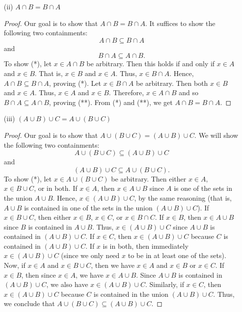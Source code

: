 \documentclass[a4paper]{article}
\begin{document}
\begin{enumerate}
\begin{proof}
        \end{proof}
    \item[(ii)] \( A \cap B = B \cap A  \)
        \begin{proof}
        Our goal is to show that \( A \cap B = B \cap A  \). It suffices to show the following two containments:
        \[ A \cap B \subseteq  B \cap A  \tag{*}  \]
        and
        \[  B \cap A \subseteq  A \cap B. \tag{**}  \]
        To show (*), let \( x \in A \cap B  \) be arbitrary. Then this holds if and only if \( x \in A  \) and \( x \in B \). That is, \( x \in B  \) and \( x \in A  \). Thus, \( x \in B \cap A   \). Hence, \( A \cap B \subseteq B \cap A  \), proving (*). Let \( x \in B \cap A  \) be arbitrary. Then both \( x \in B  \) and \( x \in A  \). Thus, \( x \in A  \) and \( x \in B  \). Therefore, \( x \in A \cap B  \) and so \(  B \cap A \subseteq  A \cap B  \), proving (**). From (*) and (**), we get \( A \cap B = B \cap A \).
        \end{proof}
    \item[(iii)] \( (A \cup B) \cup C = A \cup (B \cup C ) \)
        \begin{proof}
      Our goal is to show that \( A \cup (B \cup C) = (A \cup B) \cup C  \). We will show the following two containments:
        \[  A \cup (B \cup C) \subseteq  (A \cup B) \cup C \tag{*} \]
        and
        \[  (A \cup B) \cup C \subseteq A \cup (B \cup C). \tag{**} \]
        To show (*), let \( x \in A \cup (B \cup C) \) be arbitrary. Then either \( x \in A  \), \( x \in B \cup C  \), or in both. If \( x \in A  \), then \( x \in A \cup B \) since \( A  \) is one of the sets in the union \( A \cup B \). Hence, \( x \in (A \cup B) \cup C  \), by the same reasoning (that is, \( A \cup B  \) is contained in one of the sets in the union \( (A \cup B) \cup C   \)). If \( x \in B \cup C  \), then either \( x \in B  \), \( x \in C  \), or \( x \in B \cap C  \). If \( x \in B  \), then \( x \in A \cup B  \) since \( B  \) is contained in \( A \cup B \). Thus, \( x \in (A \cup B) \cup C  \) since \( A \cup B  \) is contained in \( (A \cup B) \cup C  \). If \( x \in C  \), then \( x \in (A \cup B) \cup C  \) because \( C  \) is contained in \( (A \cup B) \cup C  \). If \( x  \) is in both, then immediately \( x \in (A \cup B) \cup C  \) (since we only need \( x  \) to be in at least one of the sets). Now, if \( x \in A  \) and \( x \in B \cup C  \), then we have \(x \in A  \) and \( x \in B  \) or \( x \in C  \). If \( x \in B  \), then since \( x \in A  \), we have \( x \in A \cup B \). Since \( A \cup B  \) is contained in \( (A \cup B) \cup C  \), we also have \( x \in (A \cup B) \cup C  \). Similarly, if \( x \in C  \), then \( x \in (A \cup B) \cup C  \) because \( C   \) is contained in the union \( (A \cup B) \cup C  \). Thus, we conclude that \( A \cup (B \cup C ) \subseteq (A \cup B) \cup C  \).


\end{proof}
\end{enumerate}
\end{document}
